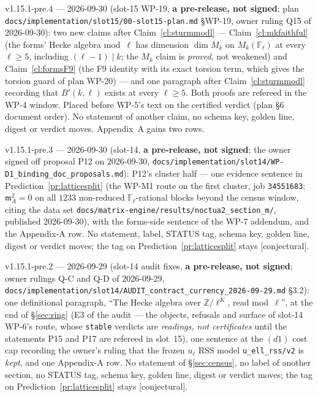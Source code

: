 \documentclass[11pt]{article}
\theoremstyle{remark}
\newcommand{\F}{\mathbb{F}}
\newcommand{\Z}{\mathbb{Z}}
\newcommand{\Fl}{\F_\ell}
\newcommand{\m}{\mathfrak{m}}
\newcommand{\CONJ}{\textsf{[conjectural]}}
\begin{document}
v1.15.1-pre.4 --- 2026-09-30 (slot-15 WP-19, \textbf{a pre-release, not signed}; plan \texttt{docs/implementation/slot15/00-slot15-plan.md}
\S WP-19, owner ruling Q15 of 2026-09-30): two new claims after Claim~\ref{cl:sturmmodl} --- Claim~\ref{cl:mkfaithful} (the forms' Hecke
algebra mod~$\ell$ has dimension $\dim M_k$ on $M_k(\Fl)$ at every $\ell\ge5$, including $(\ell-1)\mid k$; the $M_k$ claim is \emph{proved}, not
weakened) and Claim~\ref{cl:formsF9} (the F9 identity with its exact torsion term, which gives the torsion guard of plan WP-20) --- and one
paragraph after Claim~\ref{cl:sturmmodl} recording that $B'(k,\ell)$ exists at every $\ell\ge5$. Both proofs are refereed in the WP-4 window.
Placed before WP-5's text on the certified verdict (plan \S6 document order). No statement of another claim, no schema key, golden line,
digest or verdict moves. Appendix~A gains two rows.

v1.15.1-pre.3 --- 2026-09-30 (slot-14, \textbf{a pre-release, not signed}; the owner signed off proposal P12 on
2026-09-30, \texttt{docs/implementation/slot14/WP-D1\_binding\_doc\_proposals.md}): P12's cluster half --- one evidence sentence in
Prediction~\ref{pr:latticesplit} (the WP-M1 route on the first cluster, job \texttt{34551683}: $\m_A^2=0$ on all $1233$ non-reduced
$\Fl$-rational blocks beyond the census window, citing the data set \texttt{docs/matrix-engine/results/noctua2\_section\_m/}, published
2026-09-30), with the forms-side sentence of the WP-7 addendum, and the Appendix-A row. No statement, label, STATUS tag, schema key, golden
line, digest or verdict moves; the tag on Prediction~\ref{pr:latticesplit} stays \CONJ.

v1.15.1-pre.2 --- 2026-09-29 (slot-14 audit fixes, \textbf{a pre-release, not signed}; owner rulings Q-C and Q-D of 2026-09-29,
\texttt{docs/implementation/slot14/AUDIT\_contract\_currency\_2026-09-29.md} \S3.2): one definitional paragraph, ``The Hecke algebra over
$\Z/\ell^{K}$, read mod~$\ell$'', at the end of \S\ref{sec:ring} (E3 of the audit --- the objects, refusals and surface of
slot-14 WP-6's route, whose \texttt{stable} verdicts are \emph{readings, not certificates} until the statements P15 and P17 are refereed in
slot~15), one sentence at the $(d1)$ cost cap recording the owner's ruling that the frozen $u_\ell$ RSS model \texttt{u\_ell\_rss/v2} is
\emph{kept}, and one Appendix-A row. No statement of \S\ref{sec:census}, no label of another section, no STATUS tag, schema key, golden line,
digest or verdict moves; the tag on Prediction~\ref{pr:latticesplit} stays \CONJ.
\end{document}
